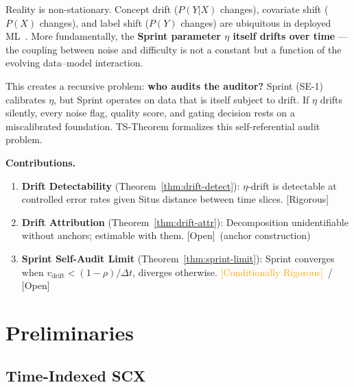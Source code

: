 \documentclass[12pt,a4paper]{article}
\newcommand{\rigorous}{\textcolor{green!50!black}{\small\textsf{[Rigorous]}}}
\newcommand{\conditionallyrigorous}{\textcolor{orange}{\small\textsf{[Conditionally Rigorous]}}}
\newcommand{\openquest}{\textcolor{red!70!black}{\small\textsf{[Open]}}}
\begin{document}
Reality is non-stationary.  Concept drift ($P(Y|X)$ changes), covariate
shift ($P(X)$ changes), and label shift ($P(Y)$ changes) are ubiquitous in
deployed ML~\citep{gama2014survey, lu2018learning}.  More fundamentally,
the \textbf{Sprint parameter $\eta$ itself drifts over time} --- the coupling
between noise and difficulty is not a constant but a function of the
evolving data--model interaction.

This creates a recursive problem: \textbf{who audits the auditor?}  Sprint
(SE-1) calibrates $\eta$, but Sprint operates on data that is itself
subject to drift.  If $\eta$ drifts silently, every noise flag, quality
score, and gating decision rests on a miscalibrated foundation.  TS-Theorem
formalizes this self-referential audit problem.

\medskip\noindent
\textbf{Contributions.}
\begin{enumerate}[label=(\arabic*)]
    \item \textbf{Drift Detectability} (Theorem~\ref{thm:drift-detect}):
          $\eta$-drift is detectable at controlled error rates given Situs
          distance between time slices.  \rigorous
    \item \textbf{Drift Attribution} (Theorem~\ref{thm:drift-attr}):
          Decomposition unidentifiable without anchors; estimable with them.
          \openquest~(anchor construction)
    \item \textbf{Sprint Self-Audit Limit} (Theorem~\ref{thm:sprint-limit}):
          Sprint converges when $v_{\mathrm{drift}} < (1-\rho)/\Delta t$,
          diverges otherwise.  \conditionallyrigorous~/ \openquest
\end{enumerate}

\section{Preliminaries}

\subsection{Time-Indexed SCX}
\end{document}
